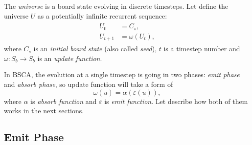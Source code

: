 \documentclass[a4paper,12pt,tikz,UTF8]{article}
\begin{document}
    The \textit{universe} is a board state evolving in discrete timesteps. Let define the universe $U$ as a potentially infinite recurrent sequence:
    \begin{align}
      \begin{split}
        U_0 &= C_s,\\
        U_{t + 1} &= \omega(U_t),
      \end{split}
    \end{align}
    where $C_s$ is an \textit{initial board state} (also called \textit{seed}), $t$ is a timestep number and $\omega: S_b \to S_b$ is an \textit{update function}.

    In BSCA, the evolution at a single timestep is going in two phases: \textit{emit phase} and \textit{absorb phase}, so update function will take a form of
    \begin{equation}
      \omega(u) = \alpha(\varepsilon(u)),
    \end{equation}
    where $\alpha$ is \textit{absorb function} and $\varepsilon$ is \textit{emit function}. Let describe how both of them works in the next sections.

  \subsection{Emit Phase}
\end{document}
